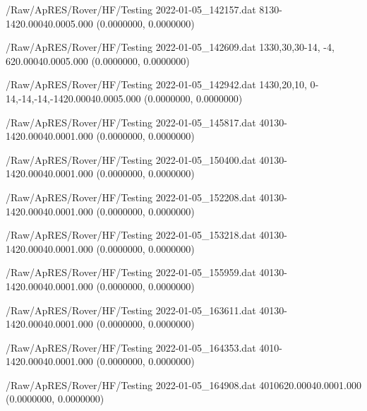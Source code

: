 \hfaprestable
{/Raw/ApRES/Rover/HF/Testing}%
{2022-01-05\_142157.dat}%
{8}{1}{30}{-14}{20.000}{40.000}{5.000}%
{ (0.0000000, 0.0000000)}%
{}%
{}%

\hfaprestable
{/Raw/ApRES/Rover/HF/Testing}%
{2022-01-05\_142609.dat}%
{1}{3}{30,30,30}{-14, -4,  6}{20.000}{40.000}{5.000}%
{ (0.0000000, 0.0000000)}%
{}%
{}%

\hfaprestable
{/Raw/ApRES/Rover/HF/Testing}%
{2022-01-05\_142942.dat}%
{1}{4}{30,20,10, 0}{-14,-14,-14,-14}{20.000}{40.000}{5.000}%
{ (0.0000000, 0.0000000)}%
{}%
{}%

\hfaprestable
{/Raw/ApRES/Rover/HF/Testing}%
{2022-01-05\_145817.dat}%
{40}{1}{30}{-14}{20.000}{40.000}{1.000}%
{ (0.0000000, 0.0000000)}%
{}%
{}%

\hfaprestable
{/Raw/ApRES/Rover/HF/Testing}%
{2022-01-05\_150400.dat}%
{40}{1}{30}{-14}{20.000}{40.000}{1.000}%
{ (0.0000000, 0.0000000)}%
{}%
{}%

\hfaprestable
{/Raw/ApRES/Rover/HF/Testing}%
{2022-01-05\_152208.dat}%
{40}{1}{30}{-14}{20.000}{40.000}{1.000}%
{ (0.0000000, 0.0000000)}%
{}%
{}%

\hfaprestable
{/Raw/ApRES/Rover/HF/Testing}%
{2022-01-05\_153218.dat}%
{40}{1}{30}{-14}{20.000}{40.000}{1.000}%
{ (0.0000000, 0.0000000)}%
{}%
{}%

\hfaprestable
{/Raw/ApRES/Rover/HF/Testing}%
{2022-01-05\_155959.dat}%
{40}{1}{30}{-14}{20.000}{40.000}{1.000}%
{ (0.0000000, 0.0000000)}%
{}%
{}%

\hfaprestable
{/Raw/ApRES/Rover/HF/Testing}%
{2022-01-05\_163611.dat}%
{40}{1}{30}{-14}{20.000}{40.000}{1.000}%
{ (0.0000000, 0.0000000)}%
{}%
{}%

\hfaprestable
{/Raw/ApRES/Rover/HF/Testing}%
{2022-01-05\_164353.dat}%
{40}{1}{0}{-14}{20.000}{40.000}{1.000}%
{ (0.0000000, 0.0000000)}%
{}%
{}%

\hfaprestable
{/Raw/ApRES/Rover/HF/Testing}%
{2022-01-05\_164908.dat}%
{40}{1}{0}{6}{20.000}{40.000}{1.000}%
{ (0.0000000, 0.0000000)}%
{}%
{}%

